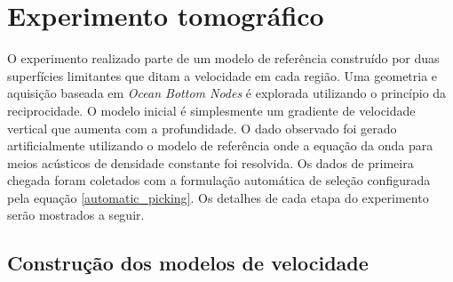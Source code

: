 \section{Experimento tomográfico}

O experimento realizado parte de um modelo de referência construído por duas superfícies limitantes que ditam a velocidade em cada região. Uma geometria e aquisição baseada em \textit{Ocean Bottom Nodes} é explorada utilizando o princípio da reciprocidade. O modelo inicial é simplesmente um gradiente de velocidade vertical que aumenta com a profundidade. O dado observado foi gerado artificialmente utilizando o modelo de referência onde a equação da onda para meios acústicos de densidade constante foi resolvida. Os dados de primeira chegada foram coletados com a formulação automática de seleção configurada pela equação \ref{automatic_picking}. Os detalhes de cada etapa do experimento serão mostrados a seguir. 

\subsection*{Construção dos modelos de velocidade}

